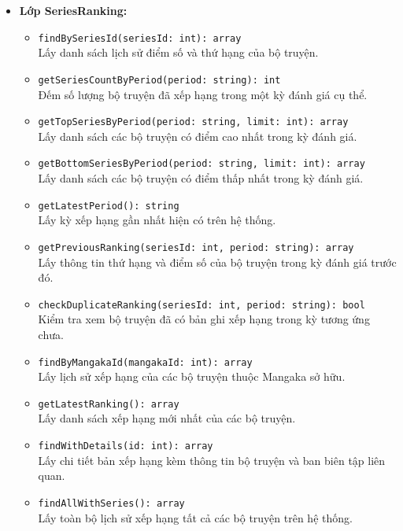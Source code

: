 \begin{itemize}
    \item \textbf{Lớp SeriesRanking:}
    \begin{itemize}
        \item \texttt{findBySeriesId(seriesId: int): array}\\
            Lấy danh sách lịch sử điểm số và thứ hạng của bộ truyện.
        \item \texttt{getSeriesCountByPeriod(period: string): int}\\
            Đếm số lượng bộ truyện đã xếp hạng trong một kỳ đánh giá cụ thể.
        \item \texttt{getTopSeriesByPeriod(period: string, limit: int): array}\\
            Lấy danh sách các bộ truyện có điểm cao nhất trong kỳ đánh giá.
        \item \texttt{getBottomSeriesByPeriod(period: string, limit: int): array}\\
            Lấy danh sách các bộ truyện có điểm thấp nhất trong kỳ đánh giá.
        \item \texttt{getLatestPeriod(): string}\\
            Lấy kỳ xếp hạng gần nhất hiện có trên hệ thống.
        \item \texttt{getPreviousRanking(seriesId: int, period: string): array}\\
            Lấy thông tin thứ hạng và điểm số của bộ truyện trong kỳ đánh giá trước đó.
        \item \texttt{checkDuplicateRanking(seriesId: int, period: string): bool}\\
            Kiểm tra xem bộ truyện đã có bản ghi xếp hạng trong kỳ tương ứng chưa.
        \item \texttt{findByMangakaId(mangakaId: int): array}\\
            Lấy lịch sử xếp hạng của các bộ truyện thuộc Mangaka sở hữu.
        \item \texttt{getLatestRanking(): array}\\
            Lấy danh sách xếp hạng mới nhất của các bộ truyện.
        \item \texttt{findWithDetails(id: int): array}\\
            Lấy chi tiết bản xếp hạng kèm thông tin bộ truyện và ban biên tập liên quan.
        \item \texttt{findAllWithSeries(): array}\\
            Lấy toàn bộ lịch sử xếp hạng tất cả các bộ truyện trên hệ thống.
    \end{itemize}


\end{itemize}
